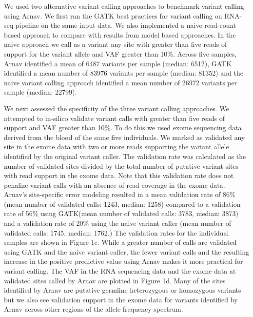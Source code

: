 We used two alternative variant calling approaches to benchmark variant calling using Arnav. We first ran the GATK best practices for variant calling on RNA-seq pipeline \cite{depristo2011ng} \cite{vanderauwera2013cpb} on the same input data. We also implemented a naive read-count based approach to compare with results from model based approaches. In the naive approach we call as a variant any site with greater than five reads of support for the variant allele and VAF greater than 10\%. Across five samples, Arnav identified a mean of 6487 variants per sample (median: 6512), GATK identified a mean number of 83976 variants per sample (median: 81352) and the naive variant calling approach identified a mean number of 26972 variants per sample (median: 22799).

We next assessed the specificity of the three variant calling approaches. We attempted to in-silico validate variant calls with greater than five reads of support and VAF greater than 10\%. To do this we used exome sequencing data derived from the blood of the same five individuals. We marked as validated any site in the exome data with two or more reads supporting the variant allele identified by the original variant caller. The validation rate was calculated as the number of validated sites divided by the total number of putative variant sites with read support in the exome data. Note that this validation rate does not penalize variant calls with an absence of read coverage in the exome data. Arnav’s site-specific error modeling resulted in a mean validation rate of 86\% (mean number of validated calls: 1243, median: 1258) compared to a validation rate of 56\% using GATK(mean number of validated calls: 3783, median: 3873) and a validation rate of 20\% using the naive variant caller (mean number of validated calls: 1745, median: 1762.) The validation rates for the individual samples are shown in Figure 1c. While a greater number of calls are validated using GATK and the naive variant caller, the fewer variant calls and the resulting increase in the positive predictive value using Arnav makes it more practical for variant calling. The VAF in the RNA sequencing data and the exome data at validated sites called by Arnav are plotted in Figure 1d. Many of the sites identified by Arnav are putative germline heterozygous or homozygous variants but we also see validation support in the exome data for variants identified by Arnav across other regions of the allele frequency spectrum.

